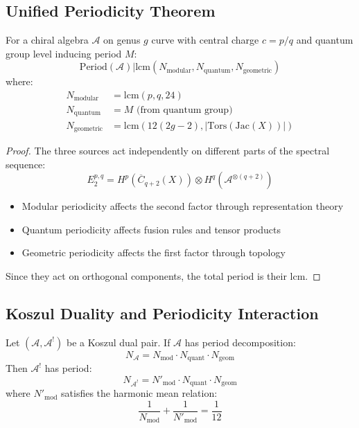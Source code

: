 \subsection{Unified Periodicity Theorem}

\begin{theorem}
For a chiral algebra $\mathcal{A}$ on genus $g$ curve with central charge $c = p/q$ and quantum group level inducing period $M$:
\[
\text{Period}(\mathcal{A}) | \text{lcm}(N_{\text{modular}}, N_{\text{quantum}}, N_{\text{geometric}})
\]
where:
\begin{align}
N_{\text{modular}} &= \text{lcm}(p, q, 24) \\
N_{\text{quantum}} &= M \text{ (from quantum group)} \\
N_{\text{geometric}} &= \text{lcm}(12(2g-2), |\text{Tors}(\text{Jac}(X))|)
\end{align}
\end{theorem}

\begin{proof}
The three sources act independently on different parts of the spectral sequence:
\[
E_2^{p,q} = H^p(\overline{C}_{q+2}(X)) \otimes H^q(\mathcal{A}^{\otimes(q+2)})
\]
\begin{itemize}
\item Modular periodicity affects the second factor through representation theory
\item Quantum periodicity affects fusion rules and tensor products
\item Geometric periodicity affects the first factor through topology
\end{itemize}

Since they act on orthogonal components, the total period is their lcm.
\end{proof}

\subsection{Koszul Duality and Periodicity Interaction}

\begin{theorem}
Let $(\mathcal{A}, \mathcal{A}^!)$ be a Koszul dual pair. If $\mathcal{A}$ has period decomposition:
\[
N_{\mathcal{A}} = N_{\text{mod}} \cdot N_{\text{quant}} \cdot N_{\text{geom}}
\]
Then $\mathcal{A}^!$ has period:
\[
N_{\mathcal{A}^!} = N'_{\text{mod}} \cdot N_{\text{quant}} \cdot N_{\text{geom}}
\]
where $N'_{\text{mod}}$ satisfies the harmonic mean relation:
\[
\frac{1}{N_{\text{mod}}} + \frac{1}{N'_{\text{mod}}} = \frac{1}{12}
\]
\end{theorem}


